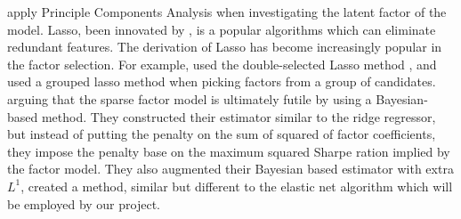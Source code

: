  apply Principle Components Analysis when investigating the latent factor of the model. 
Lasso, been innovated by , is a popular algorithms which can eliminate redundant features. 
The derivation of Lasso has become increasingly popular in the factor selection.
For example,  used the double-selected Lasso method \cite{Belloni2014}, and  used a grouped lasso method \cite{Huang2010} when picking factors from a group of candidates. 
 arguing that the sparse factor model is ultimately futile by using a Bayesian-based method. 
They constructed their estimator similar to the ridge regressor, but instead of putting the penalty on the sum of squared of factor coefficients, they impose the penalty base on the maximum squared Sharpe ration implied by the factor model.
They also augmented their Bayesian based estimator with extra $L^1$, created a method,  similar but different to the elastic net algorithm which will be employed by our project. 
